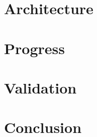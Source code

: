 \documentclass{sig-alternate-05-2015}
\begin{document}
\section{Architecture}
\label{sec:architecture}


\section{Progress}
\label{sec:progress}


\section{Validation}
\label{sec:validation}


\section{Conclusion}
\label{sec:conclusion}






\end{document}
